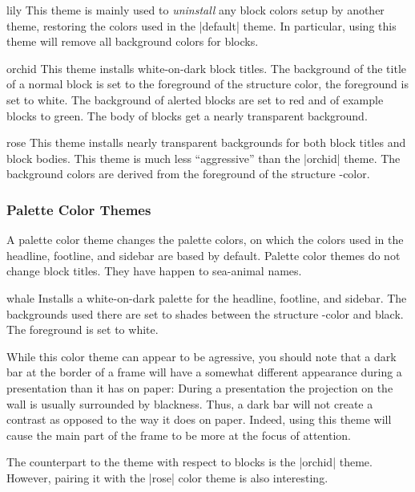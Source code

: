 \begin{colorthemeexample}{lily}
  This theme is mainly used to \emph{uninstall} any block colors setup
  by another theme, restoring the colors used in the |default|
  theme. In particular, using this theme will remove all background
  colors for blocks.
\end{colorthemeexample}

\begin{colorthemeexample}{orchid}
  This theme installs white-on-dark block titles. The background of
  the title of a normal block is set to the foreground of the
  structure color, the foreground is set to white. The background of
  alerted blocks are set to red and of example blocks to green. The
  body of blocks get a nearly transparent background.
\end{colorthemeexample}

\begin{colorthemeexample}{rose}
  This theme installs nearly transparent backgrounds for both block
  titles and block bodies. This theme is much less ``aggressive'' than
  the |orchid| theme. The background colors are derived from the
  foreground of the structure \beamer-color.
\end{colorthemeexample}


\subsubsection{Palette Color Themes}

A palette color theme  changes the palette colors, on which the colors
used in the headline, footline, and sidebar 
are based by default. Palette color themes do not change block
titles. They have happen to sea-animal names.

\begin{colorthemeexample}{whale}
  Installs a white-on-dark palette for the headline, footline, and
  sidebar. The backgrounds used there are set to shades between the
  structure \beamer-color and black. The foreground is set to
  white.

  While this color theme can appear to be agressive, you should note
  that a dark bar at the border of a frame will have a somewhat
  different appearance during a presentation than it has on paper:
  During a presentation the projection on the 
  wall is usually surrounded by blackness. Thus, a dark bar will
  not create a contrast as opposed to the way it does on
  paper. Indeed, using this theme will cause the main part of the
  frame to be more at the focus of attention.

  The counterpart to the theme with respect to blocks is the |orchid|
  theme. However, pairing it with the |rose| color theme is also
  interesting. 
\end{colorthemeexample}

